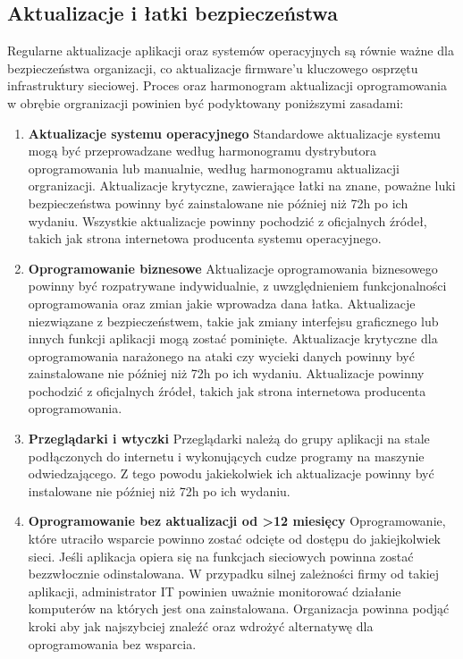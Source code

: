 \documentclass[12pt,a4paper]{article}
\begin{document}
\subsection{Aktualizacje i łatki
bezpieczeństwa}\label{aktualizacje-i-ux142atki-bezpieczeux144stwa}
Regularne aktualizacje aplikacji oraz systemów operacyjnych są równie ważne dla bezpieczeństwa organizacji, co aktualizacje firmware'u kluczowego osprzętu infrastruktury sieciowej. Proces oraz harmonogram aktualizacji oprogramowania w obrębie orgranizacji powinien być podyktowany poniższymi zasadami:
\begin{enumerate}
    \item \textbf{Aktualizacje systemu operacyjnego}
    \newline
    Standardowe aktualizacje systemu mogą być przeprowadzane według harmonogramu dystrybutora oprogramowania lub manualnie, według harmonogramu aktualizacji orgranizacji. Aktualizacje krytyczne, zawierające łatki na znane, poważne luki bezpieczeństwa powinny być zainstalowane nie później niż 72h po ich wydaniu. Wszystkie aktualizacje powinny pochodzić z oficjalnych źródeł, takich jak strona internetowa producenta systemu operacyjnego.
    \item \textbf{Oprogramowanie biznesowe}
    Aktualizacje oprogramowania biznesowego powinny być rozpatrywane indywidualnie, z uwzględnieniem funkcjonalności oprogramowania oraz zmian jakie wprowadza dana łatka. Aktualizacje niezwiązane z bezpieczeństwem, takie jak zmiany interfejsu graficznego lub innych funkcji aplikacji mogą zostać pominięte. Aktualizacje krytyczne dla oprogramowania narażonego na ataki czy wycieki danych powinny być zainstalowane nie później niż 72h po ich wydaniu. Aktualizacje powinny pochodzić z oficjalnych źródeł, takich jak strona internetowa producenta oprogramowania.
    \item \textbf{Przeglądarki i wtyczki}
    Przeglądarki należą do grupy aplikacji na stale podłączonych do internetu i wykonujących cudze programy na maszynie odwiedzającego. Z tego powodu jakiekolwiek ich aktualizacje powinny być instalowane nie później niż 72h po ich wydaniu.
    \item \textbf{Oprogramowanie bez aktualizacji od >12 miesięcy}
    Oprogramowanie, które utraciło wsparcie powinno zostać odcięte od dostępu do jakiejkolwiek sieci. Jeśli aplikacja opiera się na funkcjach sieciowych powinna zostać bezzwłocznie odinstalowana. W przypadku silnej zależności firmy od takiej aplikacji, administrator IT powinien uważnie monitorować działanie komputerów na których jest ona zainstalowana. Organizacja powinna podjąć kroki aby jak najszybciej znaleźć oraz wdrożyć alternatywę dla oprogramowania bez wsparcia.
\end{enumerate}
\end{document}
